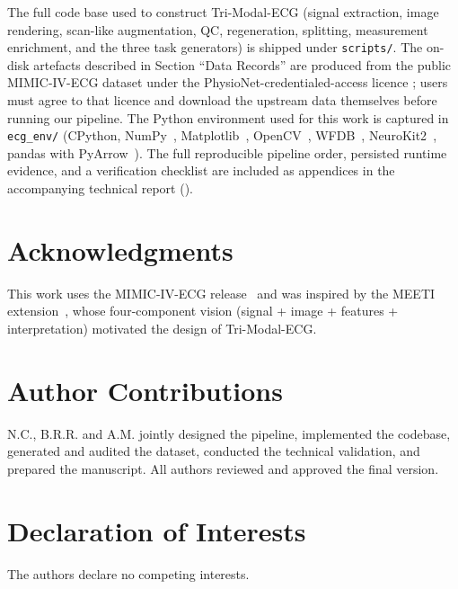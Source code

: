 \documentclass[12pt,letterpaper]{article}
\begin{document}
The full code base used to construct Tri-Modal-ECG (signal extraction, image rendering, scan-like augmentation, QC, regeneration, splitting, measurement enrichment, and the three task generators) is shipped under \texttt{scripts/}. The on-disk artefacts described in Section ``Data Records'' are produced from the public MIMIC-IV-ECG dataset under the PhysioNet-credentialed-access licence \cite{gow2023mimic, johnson2020mimic}; users must agree to that licence and download the upstream data themselves before running our pipeline. The Python environment used for this work is captured in \texttt{ecg\_env/} (CPython, NumPy~\cite{harris2020array}, Matplotlib~\cite{hunter2007matplotlib}, OpenCV~\cite{bradski2000opencv}, WFDB~\cite{xiao2018physionet}, NeuroKit2~\cite{makowski2021neurokit2}, pandas with PyArrow~\cite{vaynberg2020apache}). The full reproducible pipeline order, persisted runtime evidence, and a verification checklist are included as appendices in the accompanying technical report ().

\section*{Acknowledgments}

This work uses the MIMIC-IV-ECG release~\cite{gow2023mimic, johnson2020mimic} and was inspired by the MEETI extension~\cite{zhang2024meeti}, whose four-component vision (signal + image + features + interpretation) motivated the design of Tri-Modal-ECG.

\section*{Author Contributions}

N.C., B.R.R. and A.M. jointly designed the pipeline, implemented the codebase, generated and audited the dataset, conducted the technical validation, and prepared the manuscript. All authors reviewed and approved the final version.

\section*{Declaration of Interests}

The authors declare no competing interests.

\newpage


\end{document}
